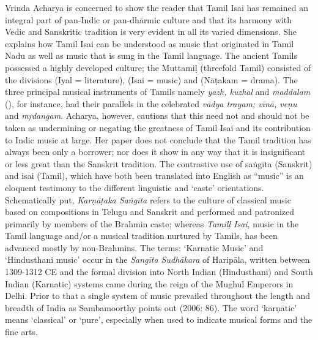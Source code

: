 Vrinda Acharya is concerned to show the reader that Tamil Isai has remained an integral part of pan-Indic or pan-dhārmic culture and that its harmony with Vedic and Sanskritic tradition is very evident in all its varied dimensions. She explains how Tamil Isai can be understood as music that originated in Tamil Nadu as well as music that is sung in the Tamil language. The ancient Tamils possessed a highly developed culture; the Muttamiḷ (threefold Tamil) consisted of the divisions (Iyal = literature), (Isai = music) and (Nāṭakam = drama). The three principal musical instruments of Tamils namely \textit{yazh, kuzhal} and \textit{maddalam} (), for instance, had their parallels in the celebrated \textit{vādya trayam; vīnā, veņu} and \textit{mŗdangam}. Acharya, however, cautions that this need not and should not be taken as undermining or negating the greatness of Tamil Isai and its contribution to Indic music at large. Her paper does not conclude that the Tamil tradition has always been only a borrower; nor does it show in any way that it is insignificant or less great than the Sanskrit tradition. The contrastive use of saṅgīta (Sanskrit) and isai (Tamil), which have both been translated into English as “music” is an eloquent testimony to the different linguistic and ‘caste’ orientations. Schematically put, \textit{Karṇāṭaka Saṅgīta} refers to the culture of classical music based on compositions in Telugu and Sanskrit and performed and patronized primarily by members of the Brahmin caste; whereas \textit{Tamilḷ Isai}, music in the Tamil language and/or a musical tradition nurtured by Tamils, has been advanced mostly by non-Brahmins. The terms: ‘Karnatic Music’ and ‘Hindusthani music’ occur in the \textit{Sangīta Sudhākara} of Haripāla, written between 1309-1312 CE and the formal division into North Indian (Hindusthani) and South Indian (Karnatic) systems came during the reign of the Mughul Emperors in Delhi. Prior to that a single system of music prevailed throughout the length and breadth of India as Sambamoorthy points out (2006: 86). The word ‘karņātic’ means ‘classical’ or ‘pure’, especially when used to indicate musical forms and the fine arts.

